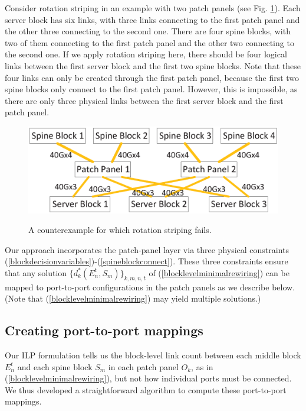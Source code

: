 \documentclass[letterpaper,twocolumn,10pt]{article}
\begin{document}
Consider rotation striping in an example with two patch panels (see Fig. \ref{infeasible}). Each server block has six links, with three links connecting to the first patch panel and the other three connecting to the second one. There are four spine blocks, with two of them connecting to the first patch panel and the other two connecting to the second one. If we apply rotation striping here, there should be four logical links between the first server block and the first two spine blocks. Note that these four links can only be created through the first patch panel, because the first two spine blocks only connect to the first patch panel. However, this is impossible, as there are only three physical links between the first server block and the first patch panel.
\begin{figure}[ht]
 \centering
 \includegraphics[scale=0.40]{infeasible}\\
\vspace{-1ex}
 \caption{A counterexample for which rotation striping fails.}\label{infeasible}
\end{figure}

Our approach incorporates the patch-panel layer via three physical constraints (\ref{blockdecisionvariables})-(\ref{spineblockconnect}). These three constraints ensure that any solution $\{d^*_k(E_n^t,S_m)\}_{k,m,n,t}$ of (\ref{blocklevelminimalrewiring}) can be mapped to port-to-port configurations in the patch panels as we describe below.  (Note that (\ref{blocklevelminimalrewiring}) may yield multiple solutions.)

\subsection{Creating port-to-port mappings}\label{MappingSection}


Our ILP formulation tells us the block-level link count  between each middle block $E_n^t$ and each spine block $S_m$ in each patch panel $O_k$, as in (\ref{blocklevelminimalrewiring}), but not how individual ports must be connected. We thus developed 
a straightforward algorithm to compute these port-to-port mappings.
\end{document}
